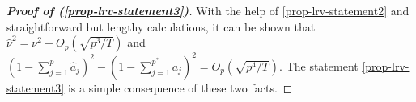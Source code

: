 \begin{proof}[\textnormal{\textbf{Proof of (\ref{prop-lrv-statement3})}}] 
With the help of \eqref{prop-lrv-statement2} and straightforward but lengthy calculations, it can be shown that $\widehat{\nu}^2 = \nu^2 + O_p(\sqrt{p^3/T})$ and $(1 - \sum_{j=1}^p \widehat{a}_j)^2 - (1 - \sum_{j=1}^{p^*} a_j)^2 = O_p(\sqrt{p^4/T})$. The statement \eqref{prop-lrv-statement3} is a simple consequence of these two facts.  
\end{proof}





